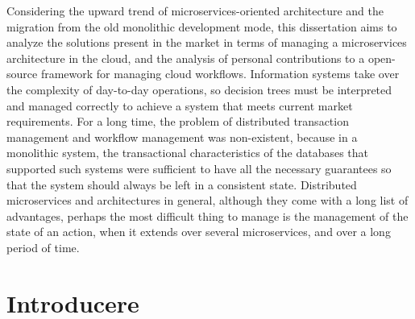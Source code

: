 \documentclass[a4paper,12pt]{report}
\renewenvironment{abstract}[1]
  {\bigskip\selectlanguage{#1}%
   \begin{center}\bfseries\abstractname\end{center}}
  {\par\bigskip}
\begin{document}
\begin{abstract}{english}\par Considering the upward trend of microservices-oriented architecture and the migration from the old monolithic development mode, this dissertation aims to analyze the solutions present in the market in terms of managing a microservices architecture in the cloud, and the analysis of personal contributions to a open-source framework for managing cloud workflows. Information systems take over the complexity of day-to-day operations, so decision trees must be interpreted and managed correctly to achieve a system that meets current market requirements. For a long time, the problem of distributed transaction management and workflow management was non-existent, because in a monolithic system, the transactional characteristics of the databases that supported such systems were sufficient to have all the necessary guarantees so that the system should always be left in a consistent state. Distributed microservices and architectures in general, although they come with a long list of advantages, perhaps the most difficult thing to manage is the management of the state of an action, when it extends over several microservices, and over a long period of time.
\end{abstract}
\tableofcontents
{}
\setcounter{page}{2}
\chapter{Introducere}
\end{document}
